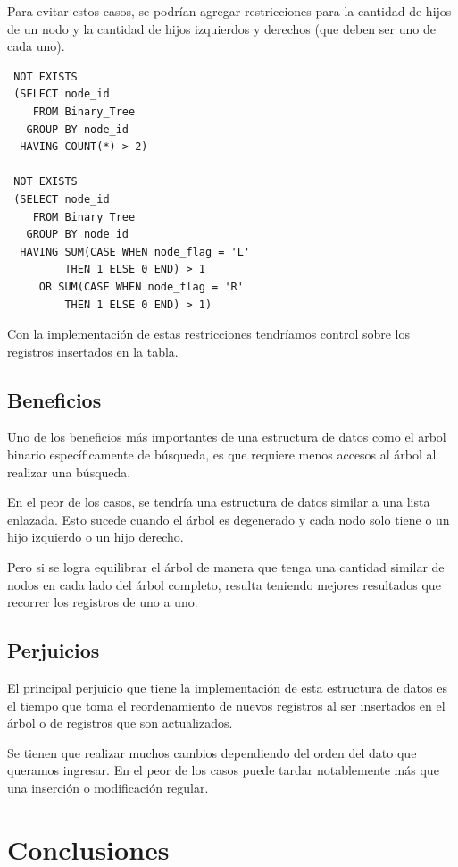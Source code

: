 \documentclass[twoside,twocolumn]{article}
\begin{document}
Para evitar estos casos, se podrían agregar restricciones para la cantidad de hijos de un nodo y la cantidad de hijos izquierdos y derechos (que deben ser uno de cada uno).

\begin{lstlisting}
 NOT EXISTS
 (SELECT node_id
    FROM Binary_Tree
   GROUP BY node_id
  HAVING COUNT(*) > 2)

 NOT EXISTS
 (SELECT node_id
    FROM Binary_Tree
   GROUP BY node_id
  HAVING SUM(CASE WHEN node_flag = 'L'
         THEN 1 ELSE 0 END) > 1
     OR SUM(CASE WHEN node_flag = 'R'
         THEN 1 ELSE 0 END) > 1)
\end{lstlisting}

Con la implementación de estas restricciones tendríamos control sobre los registros insertados en la tabla.


\subsection{Beneficios}
Uno de los beneficios más importantes de una estructura de datos como el arbol binario específicamente de búsqueda, es que requiere menos accesos al árbol al realizar una búsqueda.

En el peor de los casos, se tendría una estructura de datos similar a una lista enlazada. Esto sucede cuando el árbol es degenerado y cada nodo solo tiene o un hijo izquierdo o un hijo derecho.

Pero si se logra equilibrar el árbol de manera que tenga una cantidad similar de nodos en cada lado del árbol completo, resulta teniendo mejores resultados que recorrer los registros de uno a uno.


\subsection{Perjuicios}
El principal perjuicio que tiene la implementación de esta estructura de datos es el tiempo que toma el reordenamiento de nuevos registros al ser insertados en el árbol o de registros que son actualizados.

Se tienen que realizar muchos cambios dependiendo del orden del dato que queramos ingresar. En el peor de los casos puede tardar notablemente más que una inserción o modificación regular.
       
\section{Conclusiones}
\end{document}
